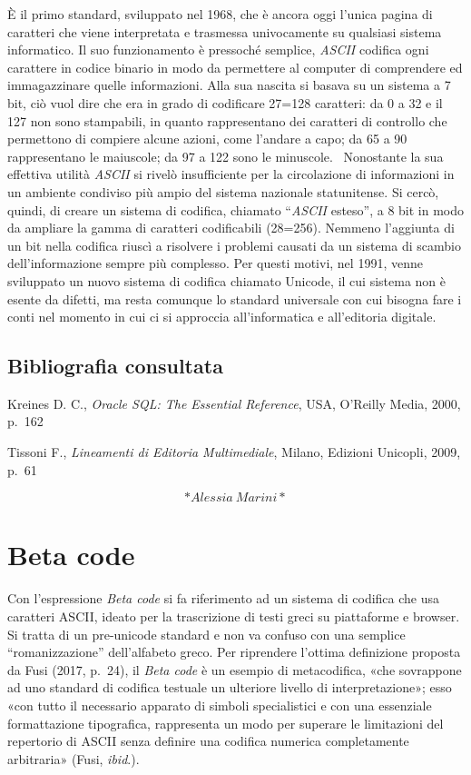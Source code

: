 \documentclass[
  b5paper,
  twoside,
  12pt,
  chapterprefix=false,
  bibliography=totocnumbered,
  parskip=false]{scrbook}
\begin{document}
È il primo standard, sviluppato nel 1968, che è ancora oggi l'unica
pagina di caratteri che viene interpretata e trasmessa univocamente su
qualsiasi sistema informatico. Il suo funzionamento è pressoché
semplice, \emph{ASCII} codifica ogni carattere in codice binario in modo da
permettere al computer di comprendere ed immagazzinare quelle
informazioni.
Alla sua nascita si basava su un sistema a 7 bit, ciò vuol dire che era
in grado di codificare 27=128 caratteri: da 0 a 32 e il 127 non sono
stampabili, in quanto rappresentano dei caratteri di controllo che
permettono di compiere alcune azioni, come l'andare a capo; da 65 a 90
rappresentano le maiuscole; da 97 a 122 sono le minuscole.~
Nonostante la sua effettiva utilità \emph{ASCII} si rivelò insufficiente per
la circolazione di informazioni in un ambiente condiviso più ampio del
sistema nazionale statunitense. Si cercò, quindi, di creare un sistema
di codifica, chiamato \enquote{\emph{ASCII} esteso}, a 8 bit in modo da ampliare la
gamma di caratteri codificabili (28=256). Nemmeno l'aggiunta di un bit
nella codifica riuscì a risolvere i problemi causati da un sistema di
scambio dell'informazione sempre più complesso.
Per questi motivi, nel 1991, venne sviluppato un nuovo sistema di
codifica chiamato Unicode, il cui sistema non è esente da difetti, ma
resta comunque lo standard universale con cui bisogna fare i conti nel
momento in cui ci si approccia all'informatica e all'editoria digitale.

\hypertarget{bibliografia-consultata-1}{%
\section*{Bibliografia consultata}\label{bibliografia-consultata-1}}

Kreines D. C., \emph{Oracle SQL: The Essential Reference}, USA, O'Reilly
Media, 2000, p.~162

Tissoni F., \emph{Lineamenti di Editoria Multimediale}, Milano, Edizioni
Unicopli, 2009, p.~61

\[*Alessia~Marini*\]

\hypertarget{beta-code}{%
\chapter{Beta code}\label{beta-code}}

Con l'espressione \emph{Beta code} si fa riferimento ad un sistema di
codifica che usa caratteri ASCII, ideato per la trascrizione di testi
greci su piattaforme e browser. Si tratta di un pre-unicode standard e
non va confuso con una semplice \enquote{romanizzazione} dell'alfabeto greco.
Per riprendere l'ottima definizione proposta da Fusi (2017, p.~24), il
\emph{Beta code} è un esempio di metacodifica, «che sovrappone ad uno
standard di codifica testuale un ulteriore livello di interpretazione»;
esso «con tutto il necessario apparato di simboli specialistici e con
una essenziale formattazione tipografica, rappresenta un modo per
superare le limitazioni del repertorio di ASCII senza definire una
codifica numerica completamente arbitraria» (Fusi, \emph{ibid}.).~
\end{document}
